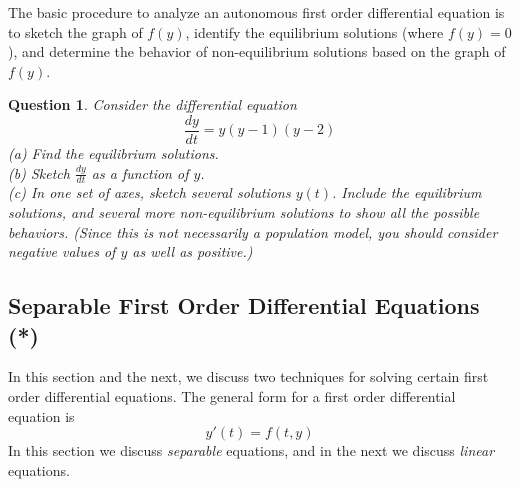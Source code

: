 \documentclass{book}
\newtheorem{question}{Question}
\begin{document}
The basic procedure to analyze an autonomous
first order differential equation is to sketch the graph of $f(y)$, identify
the equilibrium solutions (where $f(y)=0$), and determine the
behavior of non-equilibrium solutions based on the graph
of $f(y)$.

\begin{question}
Consider the differential equation
\[
   \frac{dy}{dt} = y(y-1)(y-2)
\]
(a) Find the equilibrium solutions.\\
(b) Sketch $\frac{dy}{dt}$ as a function of $y$.\\
(c) In one set of axes, sketch several solutions $y(t)$. Include the equilibrium solutions,
and several more non-equilibrium solutions to show all the possible behaviors.
(Since this is not necessarily a population model, you should consider negative values
of $y$ as well as positive.)
\end{question}



\subsection{Separable First Order Differential Equations (*)}

In this section and the next, we discuss
two techniques for solving certain first order
differential equations.
The general form for a first order differential equation is
\begin{equation}
   y'(t) = f(t,y)
\end{equation}
In this section we discuss \emph{separable} equations,
and in the next we discuss \emph{linear} equations.
\end{document}
